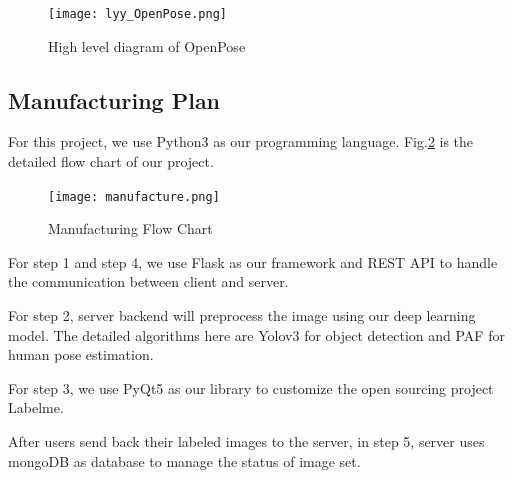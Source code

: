     \begin{figure}[h!]
        \centering \texttt{[image: lyy\_OpenPose.png]}
        \caption{High level diagram of OpenPose}
        \label{fig:openpose_arch}
    \end{figure}


\subsection{Manufacturing Plan}
For this project, we use Python3 as our programming language. Fig.\ref{fig:Manu_FlowChart} is the detailed flow chart of our project.
\begin{figure}[h!]
  \centering \texttt{[image: manufacture.png]}
  \caption{Manufacturing Flow Chart}
  \label{fig:Manu_FlowChart}
\end{figure}

For step 1 and step 4, we use Flask as our framework and REST API to handle the communication between client and server. 

For step 2, server backend will preprocess the image using our deep learning model. The detailed algorithms here are Yolov3 for object detection and PAF for human pose estimation.  


For step 3, we use PyQt5 as our library to customize the open sourcing project Labelme. 

After users send back their labeled images to the server, in step 5, server uses mongoDB as database to manage the status of image set.

